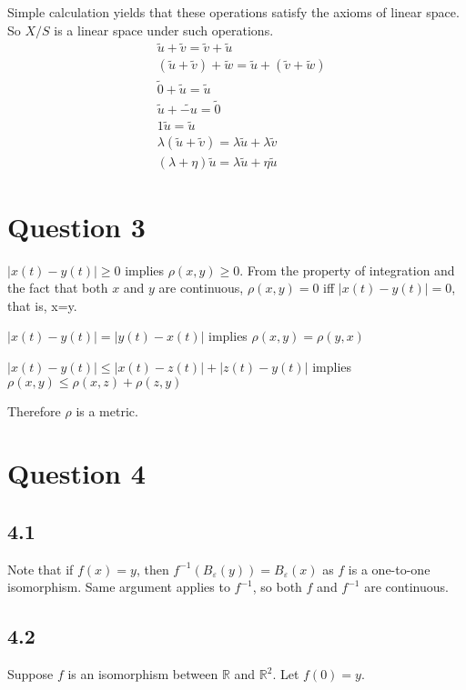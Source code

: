 \documentclass{article}
\begin{document}
Simple calculation yields that these operations satisfy the axioms of linear space. So $X/S$ is a linear space under such operations.
\begin{align*}
	&\widetilde{u}+\widetilde{v}=\widetilde{v}+\widetilde{u} \\
	&(\widetilde{u}+\widetilde{v})+\widetilde{w}=\widetilde{u}+(\widetilde{v}+\widetilde{w}) \\
	&\widetilde{0}+\widetilde{u}=\widetilde{u} \\
	&\widetilde{u}+\widetilde{-u}=\widetilde{0}\\
	&1\widetilde{u}=\widetilde{u} \\
	&\lambda(\widetilde{u}+\widetilde{v} )=\lambda\widetilde{u}+\lambda\widetilde{v} \\
	&(\lambda+\eta )\widetilde{u}=\lambda\widetilde{u}+\eta\widetilde{u}
\end{align*}


\section*{Question 3}

$|x(t)-y(t)|\geq 0$ implies $\rho(x,y)\geq 0$. From the property of integration and the fact that both $x$ and $y$ are continuous, $\rho(x,y)=0$ iff $|x(t)-y(t)|=0$, that is, x=y.


$|x(t)-y(t)|=|y(t)-x(t)|$ implies $\rho(x,y)=\rho(y,x)$

$|x(t)-y(t)|\leq |x(t)-z(t)|+|z(t)-y(t)|$ implies $\rho(x,y)\leq \rho(x,z)+\rho(z,y)$

Therefore $\rho$ is a metric.



\section*{Question 4}

\subsection*{4.1}
Note that if $f(x)=y$, then $f^{-1}(B_{\varepsilon}(y))=B_{\varepsilon}(x)$ as $f$ is a one-to-one isomorphism. Same argument applies to $f^{-1}$, so both $f$ and $f^{-1}$ are continuous.

\subsection*{4.2}
Suppose $f$ is an isomorphism between $\mathbb{R}
$ and $\mathbb{R}^2$. Let $f(0)=y$.
\end{document}

